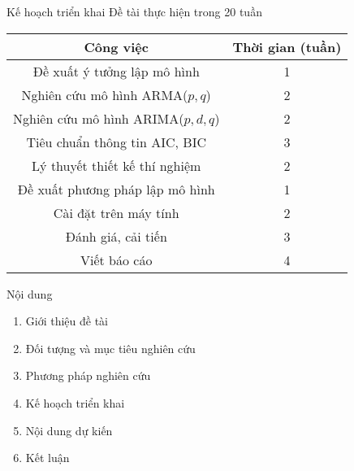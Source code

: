 \documentclass{beamer}
\begin{document}
\begin{frame}{Kế hoạch triển khai}
Đề tài thực hiện trong 20 tuần
\begin{table}
\centering
\begin{tabular}{|c|c|}
\hline
\textbf{Công việc} & \textbf{Thời gian (tuần)} \\ \hline
Đề xuất ý tưởng lập mô hình & 1 \\ \hline
Nghiên cứu mô hình ARMA(\(p, q\)) & 2 \\ \hline
Nghiên cứu mô hình ARIMA(\(p, d, q\)) & 2 \\ \hline
Tiêu chuẩn thông tin AIC, BIC & 3 \\ \hline
Lý thuyết thiết kế thí nghiệm & 2 \\ \hline
Đề xuất phương pháp lập mô hình & 1 \\ \hline
Cài đặt trên máy tính & 2 \\ \hline
Đánh giá, cải tiến & 3 \\ \hline
Viết báo cáo & 4 \\ \hline
\end{tabular}
\end{table}
\end{frame}

\begin{frame}{Nội dung}
\begin{enumerate}
\item Giới thiệu đề tài
\item Đối tượng và mục tiêu nghiên cứu
\item Phương pháp nghiên cứu
\item Kế hoạch triển khai
\item {\color{red}Nội dung dự kiến}
\item Kết luận
\end{enumerate}
\end{frame}
\end{document}
